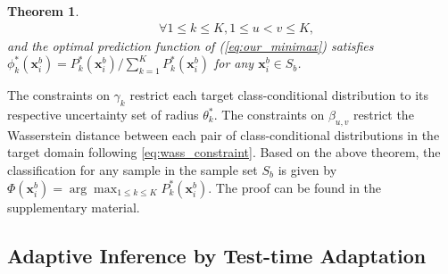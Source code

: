 \documentclass[journal]{IEEEtran}
\newtheorem{theorem}{Theorem}%
\begin{document}
\begin{theorem}
\begin{equation}
\begin{aligned}
  & \forall 1 \leq k \leq K, 1\leq u< v \leq K,
\end{aligned}
\end{equation}
and the optimal prediction function of (\ref{eq:our_minimax}) satisfies
$\phi^*_k(\boldsymbol{x}_i^b)={P_{k}^{*}\left(\boldsymbol{x}_i^b\right)}/{\sum_{k=1}^{K}P_{k}^{*}\left(\boldsymbol{x}_i^b\right)}$ for any $\boldsymbol{x}_i^b\in S_b$.
\end{theorem}
\noindent
The constraints on $\gamma_k$ restrict each target class-conditional distribution to its respective uncertainty set of radius $\theta_k^*$.
The constraints on $\beta_{u,v}$ restrict the Wasserstein distance between each pair of class-conditional distributions in the target domain following \eqref{eq:wass_constraint}.
Based on the above theorem,
the classification for any sample in the sample set $S_b$ is given by $\Phi(\boldsymbol{x}_i^b)=\arg\max_{1\leq k\leq K}P^*_k(\boldsymbol{x}_i^b)$.
{The proof can be found in 
the supplementary material.}



\subsection{Adaptive Inference by Test-time  Adaptation}
\end{document}

